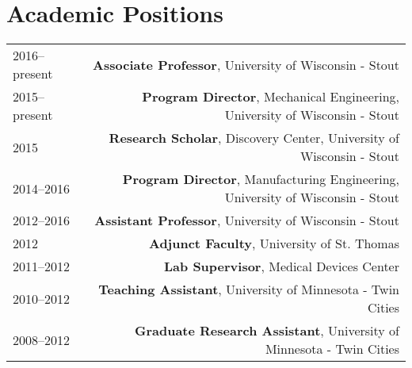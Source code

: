 \section*{Academic Positions}
\begin{tabular}{L!{\VRule}R}
2016--present&{\bf Associate Professor}, University of Wisconsin - Stout\\
2015--present&{\bf Program Director}, Mechanical Engineering, University of Wisconsin - Stout\\
2015&{\bf Research Scholar}, Discovery Center, University of Wisconsin - Stout\\
2014--2016&{\bf Program Director}, Manufacturing Engineering, University of Wisconsin - Stout\\
2012--2016&{\bf Assistant Professor}, University of Wisconsin - Stout\\
2012&\textbf{Adjunct Faculty}, University of St. Thomas\\
2011--2012&\textbf{Lab Supervisor}, Medical Devices Center\\
2010--2012&\textbf{Teaching Assistant}, University of Minnesota - Twin Cities\\
2008--2012&\textbf{Graduate Research Assistant}, University of Minnesota - Twin Cities\\
\end{tabular}